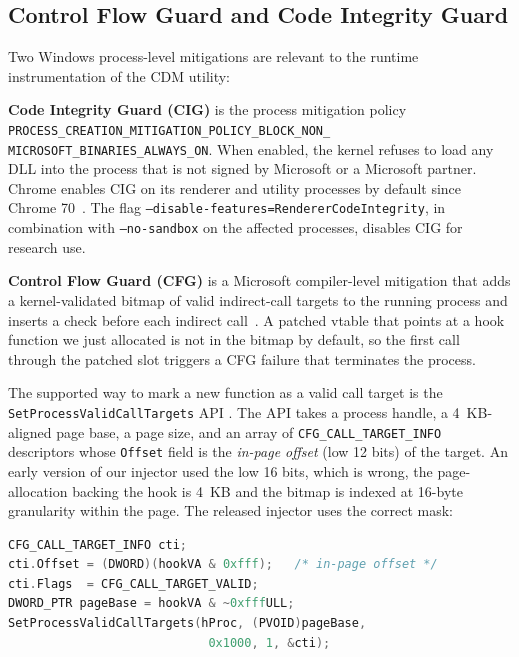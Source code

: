 \documentclass[11pt,letterpaper]{article}
\begin{document}
\subsection{Control Flow Guard and Code Integrity Guard}
\label{sec:bg-cfg-cig}

Two Windows process-level mitigations are relevant to the runtime
instrumentation of the CDM utility:

\textbf{Code Integrity Guard (CIG)} is the process mitigation
policy \texttt{PROCESS\_CREATION\_MITIGATION\_POLICY\_BLOCK\_NON\_\\MICROSOFT\_BINARIES\_ALWAYS\_ON}.
When enabled, the kernel refuses to load any DLL into the process
that is not signed by Microsoft or a Microsoft partner. Chrome
enables CIG on its renderer and utility processes by default since
Chrome 70~\cite{chromium-cig}. The flag
\texttt{--disable-features=RendererCodeIntegrity}, in combination
with \texttt{--no-sandbox} on the affected processes, disables CIG
for research use.

\textbf{Control Flow Guard (CFG)} is a Microsoft compiler-level
mitigation that adds a kernel-validated bitmap of valid indirect-call
targets to the running process and inserts a check before each
indirect call~\cite{microsoft-cfg}. A patched vtable that points
at a hook function we just allocated is not in the bitmap by
default, so the first call through the patched slot triggers a CFG
failure that terminates the process.

The supported way to mark a new function as a valid call target is
the \texttt{SetProcessValidCallTargets} API
\cite{ms-spvct-docs}. The API takes a process handle, a 4~KB-aligned
page base, a page size, and an array of \texttt{CFG\_CALL\_TARGET\_INFO}
descriptors whose \texttt{Offset} field is the \emph{in-page offset}
(low 12 bits) of the target. An early version of our injector used
the low 16 bits, which is wrong, the page-allocation backing the
hook is 4~KB and the bitmap is indexed at 16-byte granularity within
the page. The released injector uses the correct mask:

\begin{lstlisting}[language=C, basicstyle=\ttfamily\scriptsize]
CFG_CALL_TARGET_INFO cti;
cti.Offset = (DWORD)(hookVA & 0xfff);   /* in-page offset */
cti.Flags  = CFG_CALL_TARGET_VALID;
DWORD_PTR pageBase = hookVA & ~0xfffULL;
SetProcessValidCallTargets(hProc, (PVOID)pageBase,
                            0x1000, 1, &cti);
\end{lstlisting}
\end{document}
